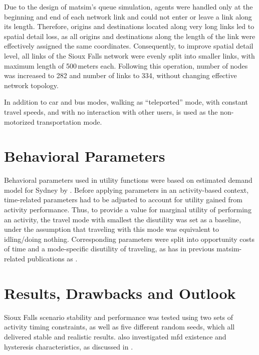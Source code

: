 Due to the design of \gls{matsim}’s queue simulation, agents were handled only at the beginning and end of each network link and could not enter or leave a link along its length. Therefore, origins and destinations located along very long links led to spatial detail loss, as all origins and destinations along the length of the link were effectively assigned the same coordinates. Consequently, to improve spatial detail level, all links of the Sioux Falls network were evenly split into smaller links, with maximum length of 500\,meters each. Following this operation, number of nodes was increased to 282 and number of links to 334, without changing effective network topology.

In addition to car and bus modes, walking as ``teleported'' mode, with constant travel speeds, and with no interaction with other users, is used as the non-motorized transportation mode. 

\section{Behavioral Parameters}
Behavioral parameters used in utility functions were based on estimated demand model for Sydney by \citet[][]{TirachiniHensherRose_TransResB_2014}. Before applying parameters in an activity-based context, time-related parameters had to be adjusted to account for utility gained from activity performance. Thus, to provide a value for marginal utility of performing an activity, the travel mode with smallest the disutility was set as a baseline, under the assumption that traveling with this mode was equivalent to idling/doing nothing. Corresponding parameters were split into opportunity costs of time and a mode-specific disutility of traveling, as has in previous \gls{matsim}-related publications as \citet[e.g,][]{KickhoeferEtAl_Transportation_2011}. 

\section{Results, Drawbacks and Outlook}
Sioux Falls scenario stability and performance was tested using two sets of activity timing constraints, as well as five different random seeds, which all delivered stable and realistic results. \citet[][]{ChakirovFourie_TechRep_FCL_2014} also investigated \gls{mfd} existence and hysteresis characteristics, as discussed in \citet[][]{GeroliminisDaganzo_TRB_2007, GeroliminisDaganzo_TransResB_2008, GeroliminisSun_TransResA_2011}. 

